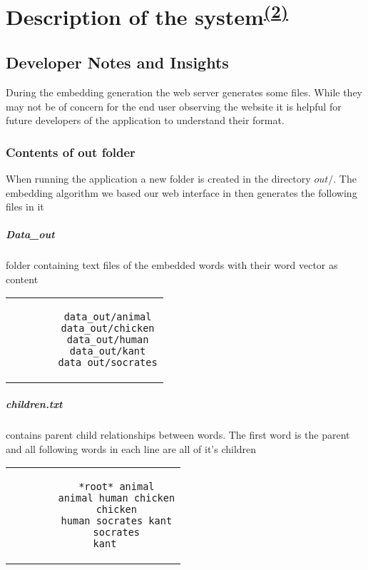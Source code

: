 \chapter{Description of the system\textsuperscript{\hyperref[Oliver]{(2)}}}
\label{dev_notes}
\section{Developer Notes and Insights}
During the embedding generation the web server generates some files. While they may not be of concern for the end user observing the website it is helpful for future developers of the application to understand their format.

\subsection{Contents of out folder}
When running the application a new folder is created in the directory $out/$. The embedding algorithm we based our web interface in then generates the following files in it
\paragraph{Data\_out} folder containing text files of the embedded words with their word vector as content
\begin{center}
	
	\begin{tabular}{c}
		\begin{lstlisting}
		data_out/animal
		data_out/chicken
		data_out/human
		data_out/kant
		data_out/socrates
		\end{lstlisting}
	\end{tabular}
\end{center}

\paragraph{children.txt} contains parent child relationships between words. The first word is the parent and all following words in each line are all of it's children
\begin{center}
	\begin{tabular}{c}
		\begin{lstlisting}
		*root* animal
		animal human chicken
		chicken
		human socrates kant
		socrates
		kant	
		\end{lstlisting}
	\end{tabular}
\end{center}

